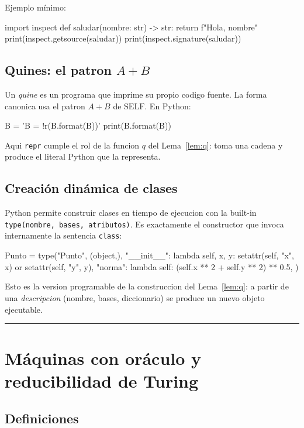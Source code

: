 \documentclass[11pt,a4paper]{article}
\theoremstyle{plain}
\theoremstyle{definition}
\theoremstyle{remark}
\newcommand{\SELF}{\mathrm{SELF}}
\begin{document}
Ejemplo m\'inimo:

\begin{pycode}
import inspect
def saludar(nombre: str) -> str:
    return f"Hola, {nombre}"
print(inspect.getsource(saludar))
print(inspect.signature(saludar))
\end{pycode}

\subsection{Quines: el patron $A+B$}

Un \emph{quine} es un programa que imprime su propio codigo fuente. La forma
canonica usa el patron $A+B$ de $\SELF$. En Python:

\begin{pycode}
B = 'B = {!r}\nprint(B.format(B))\n'
print(B.format(B))
\end{pycode}

Aqui \texttt{repr} cumple el rol de la funcion $q$ del Lema~\ref{lem:q}:
toma una cadena y produce el literal Python que la representa.

\subsection{Creaci\'on din\'amica de clases}

Python permite construir clases en tiempo de ejecucion con la built-in
\texttt{type(nombre, bases, atributos)}. Es exactamente el constructor que
invoca internamente la sentencia \texttt{class}:

\begin{pycode}
Punto = type("Punto", (object,), {
    "__init__": lambda self, x, y: setattr(self, "x", x) or setattr(self, "y", y),
    "norma": lambda self: (self.x ** 2 + self.y ** 2) ** 0.5,
})
\end{pycode}

Esto es la version programable de la construccion del Lema~\ref{lem:q}: a
partir de una \emph{descripcion} (nombre, bases, diccionario) se produce un
nuevo objeto ejecutable.

\bigskip\hrule\bigskip

\section{M\'aquinas con or\'aculo y reducibilidad de Turing}

\subsection{Definiciones}
\end{document}
